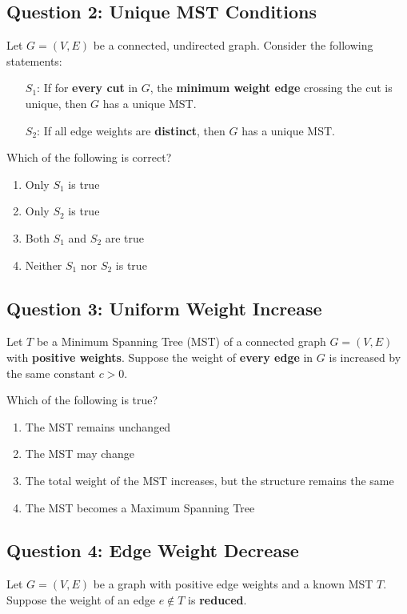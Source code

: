 \subsection*{Question 2: Unique MST Conditions}
Let $G = (V, E)$ be a connected, undirected graph. Consider the following statements:

\begin{itemize}
    \item[$S_1$:] If for \textbf{every cut} in $G$, the \textbf{minimum weight edge} crossing the cut is unique, then $G$ has a unique MST.
    \item[$S_2$:] If all edge weights are \textbf{distinct}, then $G$ has a unique MST.
\end{itemize}

Which of the following is correct?
\begin{enumerate}[label=(\alph*)]
    \item Only $S_1$ is true
    \item Only $S_2$ is true
    \item Both $S_1$ and $S_2$ are true
    \item Neither $S_1$ nor $S_2$ is true
\end{enumerate}

\subsection*{Question 3: Uniform Weight Increase}
Let $T$ be a Minimum Spanning Tree (MST) of a connected graph $G = (V, E)$ with \textbf{positive weights}. Suppose the weight of \textbf{every edge} in $G$ is increased by the same constant $c > 0$.

Which of the following is true?
\begin{enumerate}[label=(\alph*)]
    \item The MST remains unchanged
    \item The MST may change
    \item The total weight of the MST increases, but the structure remains the same
    \item The MST becomes a Maximum Spanning Tree
\end{enumerate}

\subsection*{Question 4: Edge Weight Decrease}
Let $G = (V, E)$ be a graph with positive edge weights and a known MST $T$. Suppose the weight of an edge $e \notin T$ is \textbf{reduced}.

